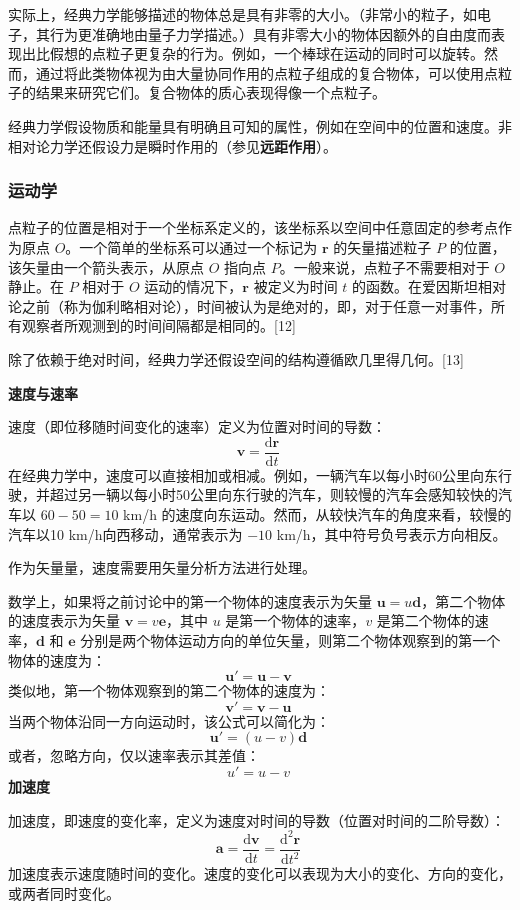实际上，经典力学能够描述的物体总是具有非零的大小。（非常小的粒子，如电子，其行为更准确地由量子力学描述。）具有非零大小的物体因额外的自由度而表现出比假想的点粒子更复杂的行为。例如，一个棒球在运动的同时可以旋转。然而，通过将此类物体视为由大量协同作用的点粒子组成的复合物体，可以使用点粒子的结果来研究它们。复合物体的质心表现得像一个点粒子。

经典力学假设物质和能量具有明确且可知的属性，例如在空间中的位置和速度。非相对论力学还假设力是瞬时作用的（参见\textbf{远距作用}）。
\subsubsection{运动学}  
点粒子的位置是相对于一个坐标系定义的，该坐标系以空间中任意固定的参考点作为原点 \( O \)。一个简单的坐标系可以通过一个标记为 \( \mathbf{r} \) 的矢量描述粒子 \( P \) 的位置，该矢量由一个箭头表示，从原点 \( O \) 指向点 \( P \)。一般来说，点粒子不需要相对于 \( O \) 静止。在 \( P \) 相对于 \( O \) 运动的情况下，\( \mathbf{r} \) 被定义为时间 \( t \) 的函数。在爱因斯坦相对论之前（称为伽利略相对论），时间被认为是绝对的，即，对于任意一对事件，所有观察者所观测到的时间间隔都是相同的。[12]  

除了依赖于绝对时间，经典力学还假设空间的结构遵循欧几里得几何。[13]

\textbf{速度与速率}  
 
速度（即位移随时间变化的速率）定义为位置对时间的导数：  
\[
\mathbf{v} = \frac{\mathrm{d} \mathbf{r}}{\mathrm{d} t}~
\]  
在经典力学中，速度可以直接相加或相减。例如，一辆汽车以每小时60公里向东行驶，并超过另一辆以每小时50公里向东行驶的汽车，则较慢的汽车会感知较快的汽车以 \( 60 - 50 = 10 \) km/h 的速度向东运动。然而，从较快汽车的角度来看，较慢的汽车以10 km/h向西移动，通常表示为 \(-10 \) km/h，其中符号负号表示方向相反。  

作为矢量量，速度需要用矢量分析方法进行处理。

数学上，如果将之前讨论中的第一个物体的速度表示为矢量 \(\mathbf{u} = u \mathbf{d}\)，第二个物体的速度表示为矢量 \(\mathbf{v} = v \mathbf{e}\)，其中 \(u\) 是第一个物体的速率，\(v\) 是第二个物体的速率，\(\mathbf{d}\) 和 \(\mathbf{e}\) 分别是两个物体运动方向的单位矢量，则第二个物体观察到的第一个物体的速度为：
\[
\mathbf{u}' = \mathbf{u} - \mathbf{v}~
\]
类似地，第一个物体观察到的第二个物体的速度为：
\[
\mathbf{v}' = \mathbf{v} - \mathbf{u}~
\]
当两个物体沿同一方向运动时，该公式可以简化为：
\[
\mathbf{u}' = (u - v) \mathbf{d}~
\]
或者，忽略方向，仅以速率表示其差值：
\[
u' = u - v~
\]
\textbf{加速度}  
 
加速度，即速度的变化率，定义为速度对时间的导数（位置对时间的二阶导数）：  
\[
\mathbf{a} = \frac{\mathrm{d} \mathbf{v}}{\mathrm{d} t} = \frac{\mathrm{d}^2 \mathbf{r}}{\mathrm{d} t^2}~
\]  
加速度表示速度随时间的变化。速度的变化可以表现为大小的变化、方向的变化，或两者同时变化。  

